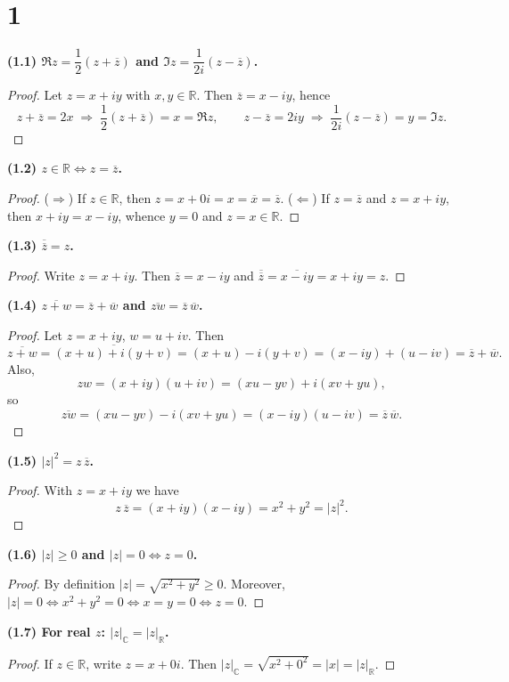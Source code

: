 \documentclass[12pt,a4paper]{article}
\theoremstyle{definition}
\theoremstyle{remark}
\begin{document}
\section*{1}

\noindent\textbf{(1.1) $\Re z=\dfrac{1}{2}(z+\overline{z})$ and $\Im z=\dfrac{1}{2i}(z-\overline{z})$.}
\begin{proof}
Let $z=x+iy$ with $x,y\in\mathbb{R}$. Then $\overline{z}=x-iy$, hence
\[
z+\overline{z}=2x \;\Rightarrow\; \frac{1}{2}(z+\overline{z})=x=\Re z,
\qquad
z-\overline{z}=2iy \;\Rightarrow\; \frac{1}{2i}(z-\overline{z})=y=\Im z.
\]
\end{proof}

\noindent\textbf{(1.2) $z\in\mathbb{R}\iff z=\overline{z}$.}
\begin{proof}
($\Rightarrow$) If $z\in\mathbb{R}$, then $z=x+0i=x=\overline{x}= \overline{z}$. 
($\Leftarrow$) If $z=\overline{z}$ and $z=x+iy$, then $x+iy=x-iy$, whence $y=0$ and $z=x\in\mathbb{R}$.
\end{proof}

\noindent\textbf{(1.3) $\overline{\overline{z}}=z$.}
\begin{proof}
Write $z=x+iy$. Then $\overline{z}=x-iy$ and $\overline{\overline{z}}=\overline{x-iy}=x+iy=z$.
\end{proof}

\noindent\textbf{(1.4) $\overline{z+w}=\overline{z}+\overline{w}$ and $\overline{zw}=\overline{z}\,\overline{w}$.}
\begin{proof}
Let $z=x+iy$, $w=u+iv$. Then
\[
\overline{z+w}=\overline{(x+u)+i(y+v)}=(x+u)-i(y+v)=(x-iy)+(u-iv)=\overline{z}+\overline{w}.
\]
Also,
\[
zw=(x+iy)(u+iv)=(xu-yv)+i(xv+yu),
\]
so
\[
\overline{zw}=(xu-yv)-i(xv+yu)=(x-iy)(u-iv)=\overline{z}\,\overline{w}.
\]
\end{proof}

\noindent\textbf{(1.5) $|z|^2=z\,\overline{z}$.}
\begin{proof}
With $z=x+iy$ we have
\[
z\,\overline{z}=(x+iy)(x-iy)=x^2+y^2=|z|^2.
\]
\end{proof}

\noindent\textbf{(1.6) $|z|\ge 0$ and $|z|=0\iff z=0$.}
\begin{proof}
By definition $|z|=\sqrt{x^2+y^2}\ge 0$. Moreover, $|z|=0\iff x^2+y^2=0\iff x=y=0\iff z=0$.
\end{proof}

\noindent\textbf{(1.7) For real $z$: $|z|_{\mathbb{C}}=|z|_{\mathbb{R}}$.}
\begin{proof}
If $z\in\mathbb{R}$, write $z=x+0i$. Then $|z|_{\mathbb{C}}=\sqrt{x^2+0^2}=|x|=|z|_{\mathbb{R}}$.
\end{proof}
\end{document}
